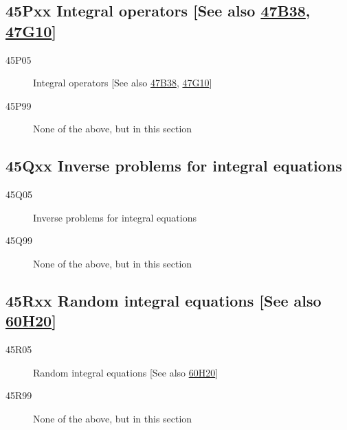\documentclass[letterpaper]{article}
\begin{document}
\subsection*{45Pxx  Integral operators [See also \hyperref[47B38]{47B38}, \hyperref[47G10]{47G10}] }\label{45Pxx}
\begin{description}  
\item [45P05]\label{45P05} Integral operators [See also \hyperref[47B38]{47B38}, \hyperref[47G10]{47G10}]
\item [45P99]\label{45P99} None of the above, but in this section
\end{description}
\subsection*{45Qxx  Inverse problems for integral equations }\label{45Qxx}
\begin{description}  
\item [45Q05]\label{45Q05} Inverse problems for integral equations
\item [45Q99]\label{45Q99} None of the above, but in this section
\end{description}
\subsection*{45Rxx  Random integral equations [See also \hyperref[60H20]{60H20}] }\label{45Rxx}
\begin{description}  
\item [45R05]\label{45R05} Random integral equations [See also \hyperref[60H20]{60H20}]
\item [45R99]\label{45R99} None of the above, but in this section
\end{description}
\end{document}
